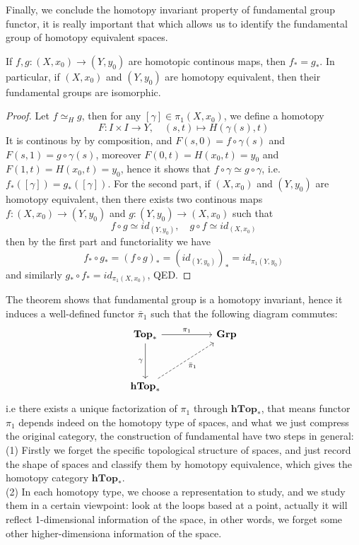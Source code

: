 \documentclass[12pt,a4paper]{article}
\begin{document}
Finally, we conclude the homotopy invariant property of fundamental group functor, it is really important that which allows us to identify the fundamental group of homotopy equivalent spaces.
\begin{theorem}
    If \(f,g:(X,x_0) \to (Y,y_0)\) are homotopic continous maps, then \(f_* = g_*\). In particular, if \((X,x_0)\) and \((Y,y_0)\) are homotopy equivalent, then their fundamental groups are isomorphic.
\end{theorem}
\begin{proof}
    Let \(f \simeq_H g\), then for any \([\gamma] \in \pi_1(X,x_0)\), we define a homotopy
    \[F:I \times I \to Y, \quad (s,t) \mapsto H(\gamma(s),t)\]
    It is continous by by composition, and \(F(s,0) = f\circ \gamma(s)\) and \(F(s,1) = g \circ \gamma(s)\), moreover \(F(0,t) = H(x_0,t) = y_0\) and \(F(1,t) = H(x_0,t) = y_0\), hence it shows that \(f \circ \gamma \simeq g \circ \gamma\), i.e. \(f_*([\gamma]) = g_*([\gamma])\).
    For the second part, if \((X,x_0)\) and \((Y,y_0)\) are homotopy equivalent, then there exists two continous maps \(f:(X,x_0) \to (Y,y_0)\) and \(g:(Y,y_0) \to (X,x_0)\) such that
    \[f \circ g \simeq id_{(Y,y_0)}, \quad g \circ f \simeq id_{(X,x_0)}\]
    then by the first part and functoriality we have 
    \[f_* \circ g_* = (f \circ g)_* = (id_{(Y,y_0)})_* = id_{\pi_1(Y,y_0)}\]
    and similarly \(g_* \circ f_* = id_{\pi_1(X,x_0)}\), QED.
\end{proof}

\begin{remark}
    The theorem shows that fundamental group is a homotopy invariant, hence it induces a well-defined functor \(\bar{\pi}_1\) such that the following diagram commutes:
\[\begin{tikzcd}
	{\mathbf{Top}_*} && {\mathbf{Grp}} \\
	\\
	{\mathbf{hTop}_*}
	\arrow["{\pi_1}", from=1-1, to=1-3]
	\arrow["\gamma"', from=1-1, to=3-1]
	\arrow["{\bar{\pi}_1}"', dashed, from=3-1, to=1-3]
\end{tikzcd}\]
i.e there exists a unique factorization of \(\pi_1\) through \(\mathbf{hTop}_*\), that means functor \(\pi_1\) depends indeed on the homotopy type of spaces, and what we just compress the original category, the construction of fundamental have two steps in general:
(1) Firstly we forget the specific topological structure of spaces, and just record the shape of spaces and classify them by homotopy equivalence, which gives the homotopy category \(\mathbf{hTop}_*\).\\
(2) In each homotopy type, we choose a representation to study, and we study them in a certain viewpoint: look at the loops based at a point, actually it will reflect 1-dimensional information of the space, in other words, we forget some other higher-dimensiona information of the space.\\
\end{remark}
\end{document}
